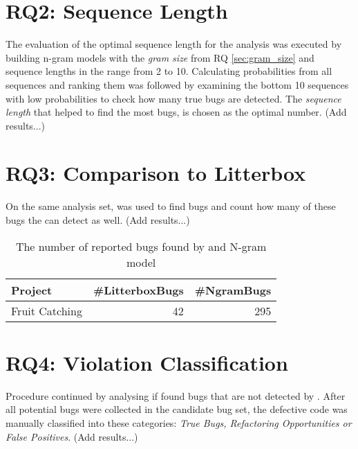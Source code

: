 \section{RQ2: Sequence Length}\label{sec:sequence_length}
The evaluation of the optimal sequence length for the analysis was executed by building n-gram models with the \textit{gram size} from RQ \ref{sec:gram_size} and {sequence lengths} in the range from 2 to 10. Calculating probabilities from all sequences and ranking them was followed by examining the bottom 10 sequences with low probabilities to check how many true bugs are detected. The \textit{sequence length} that helped to find the most bugs, is chosen as the optimal number. (Add results...)



\section{RQ3: Comparison to Litterbox}\label{sec:litterbox}
On the same analysis set, \litterbox{} was used to find bugs and count how many of these bugs the \ngram{} can detect as well. (Add results...)

\begin{table}[H]
    \centering
    \caption[The number of reported bugs found by \litterbox{} and N-gram model]{\label{tab:litterbox}The number of reported bugs found by \litterbox{} and N-gram model}
    \begin{tabular}{lrr}
        \toprule
        Project & \#LitterboxBugs & \#NgramBugs \\
        \midrule
        Fruit Catching & 42 & 295 \\
        \bottomrule
    \end{tabular}
\end{table}
 
 
\section{RQ4: Violation Classification}\label{sec:violations}
Procedure  continued by analysing if \ngram{} found bugs that are not detected by \litterbox{}. After all potential bugs were collected in the candidate bug set, the defective code was manually classified into these categories: \textit{True Bugs, Refactoring Opportunities or False Positives}. (Add results...)

